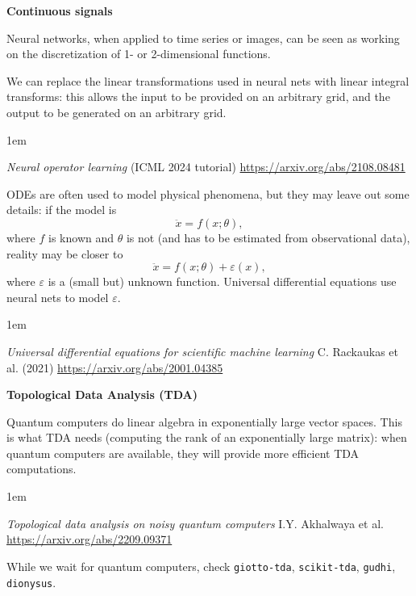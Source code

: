 \documentclass[a5paper]{article}
\let\epsilon\varepsilon
\newenvironment{reference}{%
  \medskip\goodbreak
  \parskip 0pt
  \raggedright
  \leftskip 1em
  \obeylines
}{\par\medskip\goodbreak}
\def\subsection#1{{\par\bigskip\goodbreak\large\bfseries #1\par}}
\begin{document}
\subsection{Continuous signals}

Neural networks, when applied to time series or images,
can be seen as working on the discretization of 1- or 2-dimensional functions.

We can replace the linear transformations used in neural nets
with linear integral transforms: this allows the input to be provided on an arbitrary grid,
and the output to be generated on an arbitrary grid.

\begin{reference}
  \emph{Neural operator learning}
  (ICML 2024 tutorial)
  \url{https://arxiv.org/abs/2108.08481}
\end{reference}

ODEs are often used to model physical phenomena,
but they may leave out some details:
if the model is
\[ \ddot x = f(x; \theta), \]
where $f$ is known and $\theta$ is not (and has to be estimated from observational data),
reality may be closer to
\[ \ddot x = f(x; \theta) + \epsilon(x), \]
where $\epsilon$ is a (small but) unknown function.
Universal differential equations use neural nets to model $\epsilon$.

\begin{reference}
  \emph{Universal differential equations for scientific machine learning}
  C. Rackaukas et al. (2021)
  \url{https://arxiv.org/abs/2001.04385}
\end{reference}

\subsection{Topological Data Analysis (TDA)}

Quantum computers do linear algebra in exponentially large vector spaces.
This is what TDA needs (computing the rank of an exponentially large matrix):
when quantum computers are available, they will provide more efficient TDA computations. 

\begin{reference}
  \emph{Topological data analysis on noisy quantum computers}
  I.Y. Akhalwaya et al.
  \url{https://arxiv.org/abs/2209.09371}
\end{reference}

While we wait for quantum computers,
check \texttt{giotto-tda}, \texttt{scikit-tda}, \texttt{gudhi}, \texttt{dionysus}.
\end{document}

